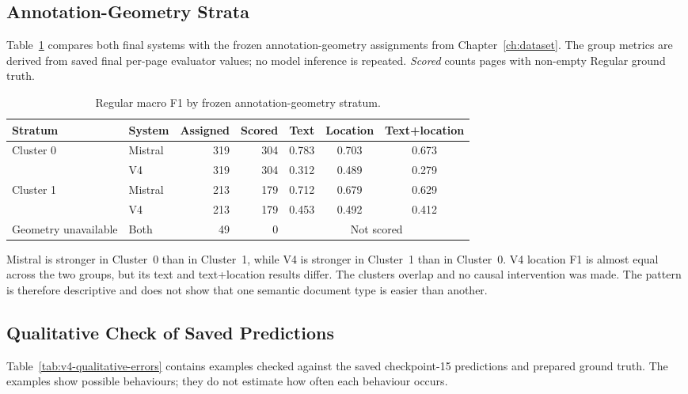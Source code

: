 \subsection{Annotation-Geometry Strata}
\label{sec:stage3-per-cluster}

Table~\ref{tab:exp1-cluster} compares both final systems with the frozen
annotation-geometry assignments from Chapter~\ref{ch:dataset}. The group metrics
are derived from saved final per-page evaluator values; no model inference is
repeated. \emph{Scored} counts pages with non-empty Regular ground truth.

\begin{table}[ht]
  \centering
  \caption{Regular macro F1 by frozen annotation-geometry stratum.}
  \label{tab:exp1-cluster}
  \footnotesize
  \begin{tabular}{@{}llrrccc@{}}
    \toprule
    \textbf{Stratum} & \textbf{System} & \textbf{Assigned} & \textbf{Scored} &
    \textbf{Text} & \textbf{Location} & \textbf{Text+location} \\
    \midrule
    Cluster 0 & Mistral & 319 & 304 & 0.783 & 0.703 & 0.673 \\
              & V4      & 319 & 304 & 0.312 & 0.489 & 0.279 \\
    \midrule
    Cluster 1 & Mistral & 213 & 179 & 0.712 & 0.679 & 0.629 \\
              & V4      & 213 & 179 & 0.453 & 0.492 & 0.412 \\
    \midrule
    Geometry unavailable & Both & 49 & 0 & \multicolumn{3}{c}{Not scored} \\
    \bottomrule
  \end{tabular}
\end{table}

Mistral is stronger in Cluster~0 than in Cluster~1, while V4 is stronger in
Cluster~1 than in Cluster~0. V4 location F1 is almost equal across the two
groups, but its text and text+location results differ. The clusters overlap and
no causal intervention was made. The pattern is therefore descriptive and does
not show that one semantic document type is easier than another.

\subsection{Qualitative Check of Saved Predictions}

Table~\ref{tab:v4-qualitative-errors} contains examples checked against the
saved checkpoint-15 predictions and prepared ground truth. The examples show
possible behaviours; they do not estimate how often each behaviour occurs.

